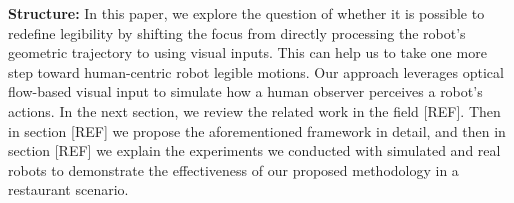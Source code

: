 
\noindent
\textbf{Structure:}
In this paper, we explore the question of whether it is possible to redefine legibility by shifting the focus from directly processing the robot's geometric trajectory to using visual inputs.
This can help us to take one more step toward human-centric robot legible motions.
Our approach leverages optical flow-based visual input to simulate how a human observer perceives a robot’s actions. 
%
In the next section, we review the related work in the field [REF].
Then in section [REF] we propose the aforementioned framework in detail,
and then in section [REF] we explain the experiments we conducted with simulated and real robots to demonstrate the effectiveness of our proposed methodology in a restaurant scenario.

